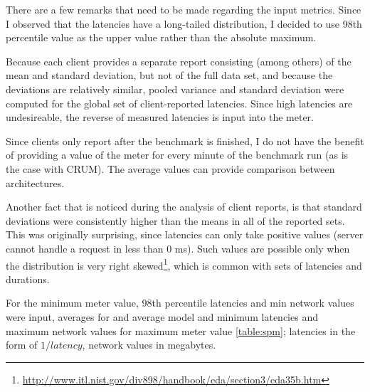 \documentclass{uvamscse}
\begin{document}
There are a few remarks that need to be made regarding the input metrics. Since I observed that the latencies have a long-tailed distribution, I decided to use 98th percentile value as the upper value rather than the absolute maximum.

Because each client provides a separate report consisting (among others) of the mean and standard deviation, but not of the full data set, and because the deviations are relatively similar, pooled variance and standard deviation were computed for the global set of client-reported latencies. Since high latencies are undesireable, the reverse of measured latencies is input into the meter.

Since clients only report after the benchmark is finished, I do not have the benefit of providing a value of the meter for every minute of the benchmark run (as is the case with CRUM). The average values can provide comparison between architectures.

Another fact that is noticed during the analysis of client reports, is that standard deviations were consistently higher than the means in all of the reported sets. This was originally surprising, since latencies can only take positive values (server cannot handle a request in less than 0 ms). Such values are possible only when the distribution is very right skewed\footnote{\url{http://www.itl.nist.gov/div898/handbook/eda/section3/eda35b.htm}}, which is common with sets of latencies and durations.

For the minimum meter value, 98th percentile latencies and min network values were input, averages for and average model and minimum latencies and maximum network values for maximum meter value \ref{table:spm}; latencies in the form of $1/latency$, network values in megabytes.
\end{document}
